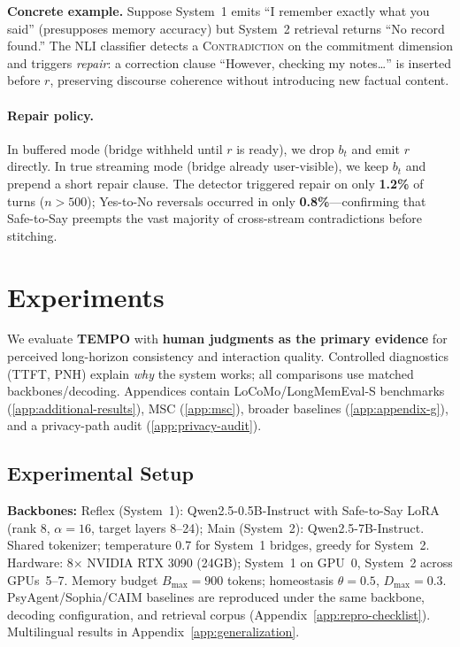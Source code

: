 \documentclass[11pt]{article}
\begin{document}
\textbf{Concrete example.} Suppose System~1 emits ``I remember exactly what you said'' (presupposes memory accuracy) but System~2 retrieval returns ``No record found.''
The NLI classifier detects a \textsc{Contradiction} on the commitment dimension and triggers \emph{repair}: a correction clause ``However, checking my notes\ldots'' is inserted before $r$, preserving discourse coherence without introducing new factual content.

\paragraph{Repair policy.}
In buffered mode (bridge withheld until $r$ is ready), we drop $b_t$ and emit $r$ directly.
In true streaming mode (bridge already user-visible), we keep $b_t$ and prepend a short repair clause.
The detector triggered repair on only \textbf{1.2\%} of turns ($n > 500$); Yes-to-No reversals occurred in only \textbf{0.8\%}---confirming that Safe-to-Say preempts the vast majority of cross-stream contradictions before stitching.
\section{Experiments}

We evaluate \textbf{TEMPO} with \textbf{human judgments as the primary evidence} for perceived long-horizon consistency and interaction quality. Controlled diagnostics (TTFT, PNH) explain \emph{why} the system works; all comparisons use matched backbones/decoding. Appendices contain LoCoMo/LongMemEval-S benchmarks (\ref{app:additional-results}), MSC (\ref{app:msc}), broader baselines (\ref{app:appendix-g}), and a privacy-path audit (\ref{app:privacy-audit}).

\subsection{Experimental Setup}
\label{sec:benchmarks-and-baselines}
\textbf{Backbones:} Reflex (System~1): Qwen2.5-0.5B-Instruct with Safe-to-Say LoRA (rank 8, $\alpha{=}16$, target layers 8--24); Main (System~2): Qwen2.5-7B-Instruct. Shared tokenizer; temperature 0.7 for System~1 bridges, greedy for System~2. Hardware: 8$\times$ NVIDIA RTX 3090 (24GB); System~1 on GPU~0, System~2 across GPUs~5--7. Memory budget $B_{\max}{=}900$ tokens; homeostasis $\theta{=}0.5$, $D_{\max}{=}0.3$. PsyAgent/Sophia/CAIM baselines are reproduced under the same backbone, decoding configuration, and retrieval corpus (Appendix~\ref{app:repro-checklist}). Multilingual results in Appendix~\ref{app:generalization}.
\end{document}
